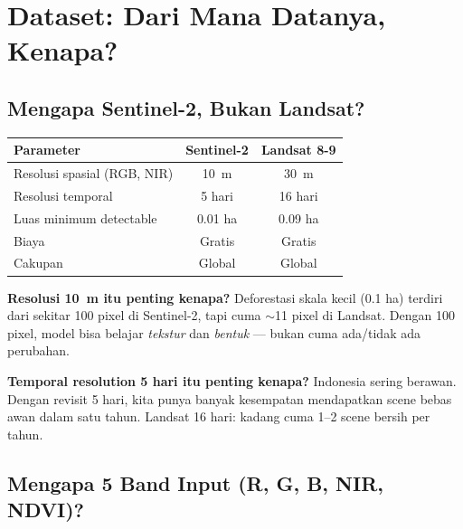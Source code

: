 \documentclass[10pt,a4paper,onecolumn]{article}
\begin{document}
\section{Dataset: Dari Mana Datanya, Kenapa?}

\subsection{Mengapa Sentinel-2, Bukan Landsat?}

\begin{table}[ht]
\centering
\small
\begin{tabular}{lcc}
\toprule
\textbf{Parameter} & \textbf{Sentinel-2} & \textbf{Landsat 8-9} \\
\midrule
Resolusi spasial (RGB, NIR) & 10~m & 30~m \\
Resolusi temporal & 5 hari & 16 hari \\
Luas minimum detectable & 0.01 ha & 0.09 ha \\
Biaya & Gratis & Gratis \\
Cakupan & Global & Global \\
\bottomrule
\end{tabular}
\end{table}

\textbf{Resolusi 10~m itu penting kenapa?} Deforestasi skala kecil
(0.1 ha) terdiri dari sekitar 100 pixel di Sentinel-2, tapi cuma
$\sim$11 pixel di Landsat. Dengan 100 pixel, model bisa belajar
\textit{tekstur} dan \textit{bentuk} — bukan cuma ada/tidak ada
perubahan.

\textbf{Temporal resolution 5 hari itu penting kenapa?} Indonesia
sering berawan. Dengan revisit 5 hari, kita punya banyak kesempatan
mendapatkan scene bebas awan dalam satu tahun. Landsat 16 hari:
kadang cuma 1--2 scene bersih per tahun.

\subsection{Mengapa 5 Band Input (R, G, B, NIR, NDVI)?}
\end{document}

